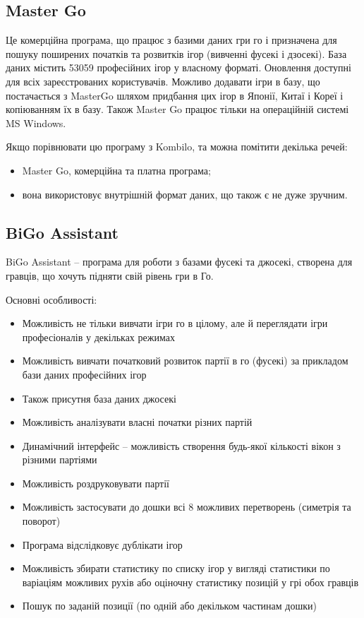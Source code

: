 \subsection{Master Go}
Це комерційна програма, що працює з базими даних гри го і призначена для пошуку поширених початків та розвитків ігор (вивченні фусекі і дзосекі). База даних містить 53059 професійних ігор у власному форматі. Оновлення доступні для всіх зареєстрованих користувачів.  Можливо додавати ігри в базу, що постачається з MasterGo шляхом придбання цих ігор в Японії, Китаї і Кореї і копіюванням їх в базу. Також Master Go працює тільки на операційній системі MS Windows.

Якщо порівнювати цю програму з Kombilo, та можна помітити декілька речей:
\begin{itemize}
	\item Master Go, комерційна та платна програма;
	\item вона використовує внутрішній формат даних, що також є не дуже зручним.
\end{itemize}
\subsection{BiGo Assistant}
BiGo Assistant -- програма для роботи з базами фусекі та джосекі, створена для гравців, що хочуть підняти свій рівень гри в Го.

Основні особливості:
\begin{itemize}
	\item Можливість не тільки вивчати ігри го в цілому, але й переглядати ігри професіоналів у декільках режимах
	\item Можливість вивчати початковий розвиток партії в го (фусекі) за прикладом бази даних професійних ігор
	\item Також присутня база даних джосекі
	\item Можливість аналізувати власні початки різних партій
	\item Динамічний інтерфейс -- можливість створення будь-якої кількості вікон з різними партіями
	\item Можливість роздруковувати партії
	\item Можливість застосувати до дошки всі 8 можливих перетворень (симетрія та поворот)
	\item Програма відслідковує дублікати ігор
	\item Можливість збирати статистику по списку ігор у вигляді статистики по варіаціям можливих рухів або оціночну статистику позицій у грі обох гравців
	\item Пошук по заданій позиції (по одній або декільком частинам дошки)
\end{itemize}


